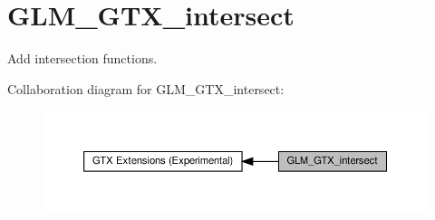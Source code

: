 \hypertarget{group__gtx__intersect}{}\section{G\+L\+M\+\_\+\+G\+T\+X\+\_\+intersect}
\label{group__gtx__intersect}


Add intersection functions.  


Collaboration diagram for G\+L\+M\+\_\+\+G\+T\+X\+\_\+intersect\+:\nopagebreak
\begin{figure}[H]
\begin{center}
\leavevmode
\includegraphics[width=350pt]{group__gtx__intersect}
\end{center}
\end{figure}
